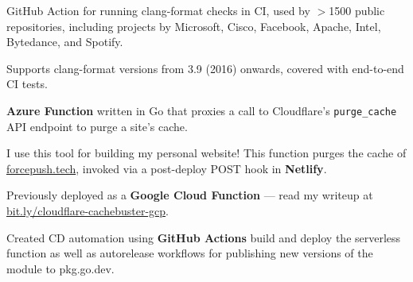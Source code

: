 \documentclass[]{jidicula-resume}
\begin{document}
\begin{tightemize}
\item GitHub Action for running clang-format checks in CI, used by $>$1500 public repositories, including projects by Microsoft, Cisco, Facebook, Apache, Intel, Bytedance, and Spotify.
\item Supports clang-format versions from 3.9 (2016) onwards, covered with end-to-end CI tests.
\end{tightemize}
\sectionsep{}

\begin{tightemize}
\item \textbf{Azure Function} written in Go that proxies a call to Cloudflare's \texttt{purge_cache} API endpoint to purge a site's cache.
\item I use this tool for building my personal website! This function purges the cache of \href{https://forcepush.tech}{forcepush.tech}, invoked via a post-deploy POST hook in \textbf{Netlify}.
\item Previously deployed as a \textbf{Google Cloud Function} --- read my writeup at \href{https://bit.ly/cloudflare-cachebuster-gcp}{bit.ly/cloudflare-cachebuster-gcp}.
\item Created CD automation using \textbf{GitHub Actions} build and deploy the serverless function as well as autorelease workflows for publishing new versions of the module to pkg.go.dev.
\end{tightemize}
\sectionsep{}

\end{document}
